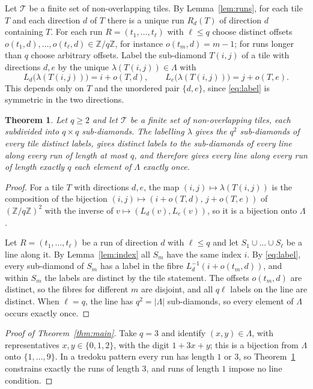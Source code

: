 \documentclass[11pt,a4paper]{amsart}
\newtheorem{theorem}{Theorem}[section]
\theoremstyle{definition}
\theoremstyle{remark}
\newcommand{\Z}{\mathbb{Z}}
\begin{document}
Let $\mathcal T$ be a finite set of non-overlapping tiles. By Lemma~\ref{lem:runs}, for each tile $T$ and each direction $d$ of $T$ there is a unique run $R_d(T)$ of direction $d$ containing $T$. For each run $R=(t_1,\dots,t_\ell)$ with $\ell\le q$ choose distinct offsets $o(t_1,d),\dots,o(t_\ell,d)\in\Z/q\Z$, for instance $o(t_m,d)=m-1$; for runs longer than $q$ choose arbitrary offsets. Label the sub-diamond $T(i,j)$ of a tile with directions $d,e$ by the unique $\lambda(T(i,j))\in\Lambda$ with
\begin{equation}\label{eq:label}
L_d\bigl(\lambda(T(i,j))\bigr)=i+o(T,d),\qquad L_e\bigl(\lambda(T(i,j))\bigr)=j+o(T,e).
\end{equation}
This depends only on $T$ and the unordered pair $\{d,e\}$, since \eqref{eq:label} is symmetric in the two directions.

\begin{theorem}\label{thm:general}
Let $q\ge 2$ and let $\mathcal T$ be a finite set of non-overlapping tiles, each subdivided into $q\times q$ sub-diamonds. The labelling $\lambda$ gives the $q^2$ sub-diamonds of every tile distinct labels, gives distinct labels to the sub-diamonds of every line along every run of length at most $q$, and therefore gives every line along every run of length exactly $q$ each element of $\Lambda$ exactly once.
\end{theorem}

\begin{proof}
For a tile $T$ with directions $d,e$, the map $(i,j)\mapsto\lambda(T(i,j))$ is the composition of the bijection $(i,j)\mapsto(i+o(T,d),\,j+o(T,e))$ of $(\Z/q\Z)^2$ with the inverse of $v\mapsto(L_d(v),L_e(v))$, so it is a bijection onto $\Lambda$.

Let $R=(t_1,\dots,t_\ell)$ be a run of direction $d$ with $\ell\le q$ and let $S_1\cup\dots\cup S_\ell$ be a line along it. By Lemma~\ref{lem:index} all $S_m$ have the same index $i$. By \eqref{eq:label}, every sub-diamond of $S_m$ has a label in the fibre $L_d^{-1}(i+o(t_m,d))$, and within $S_m$ the labels are distinct by the tile statement. The offsets $o(t_m,d)$ are distinct, so the fibres for different $m$ are disjoint, and all $q\ell$ labels on the line are distinct. When $\ell=q$, the line has $q^2=|\Lambda|$ sub-diamonds, so every element of $\Lambda$ occurs exactly once.
\end{proof}

\begin{proof}[Proof of Theorem~\ref{thm:main}]
Take $q=3$ and identify $(x,y)\in\Lambda$, with representatives $x,y\in\{0,1,2\}$, with the digit $1+3x+y$; this is a bijection from $\Lambda$ onto $\{1,\dots,9\}$. In a tredoku pattern every run has length $1$ or $3$, so Theorem~\ref{thm:general} constrains exactly the runs of length $3$, and runs of length $1$ impose no line condition.
\end{proof}
\end{document}
